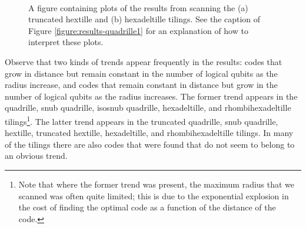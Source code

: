 \documentclass[12pt]{amsbook}
\theoremstyle{plain}
\theoremstyle{definition}
\theoremstyle{remark}
\begin{document}
\begin{figure}
\centering
{} \\
\caption{
\label{figure:results-hextille2}
A figure containing plots of the results from scanning the (a) truncated hextille and (b) hexadeltille tilings.  See the caption of Figure \ref{figure:results-quadrille1} for an explanation of how to interpret these plots.
}
\end{figure}

Observe that two kinds of trends appear frequently in the results:  codes that grow in distance but remain constant in the number of logical qubits as the radius increase, and codes that remain constant in distance but grow in the number of logical qubits as the radius increases.  The former trend appears in the quadrille, snub quadrille, isosnub quadrille, hexadeltille, and rhombihexadeltille tilings\footnote{Note that where the former trend was present, the maximum radius that we scanned was often quite limited;  this is due to the exponential explosion in the cost of finding the optimal code as a function of the distance of the code.}.  The latter trend appears in the truncated quadrille, snub quadrille, hextille, truncated hextille, hexadeltille, and rhombihexadeltille tilings.  In many of the tilings there are also codes that were found that do not seem to belong to an obvious trend.
\end{document}
